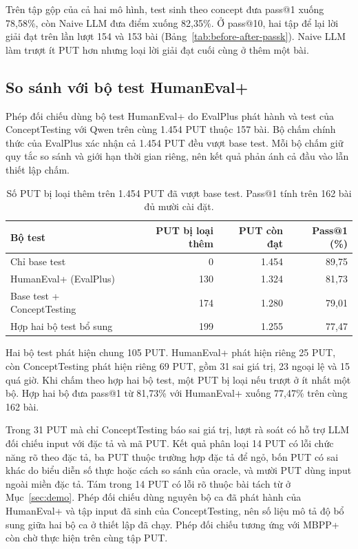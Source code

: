 Trên tập gộp của cả hai mô hình, test sinh theo concept đưa pass@1 xuống 78,58\%, còn Naive LLM đưa điểm xuống 82,35\%. Ở pass@10, hai tập để lại lời giải đạt trên lần lượt 154 và 153 bài (Bảng~\ref{tab:before-after-passk}). Naive LLM làm trượt ít PUT hơn nhưng loại lời giải đạt cuối cùng ở thêm một bài.

\subsection{So sánh với bộ test HumanEval+}
\label{sec:evalplus-comparison}

Phép đối chiếu dùng bộ test HumanEval+ do EvalPlus phát hành và test của ConceptTesting với Qwen trên cùng 1.454 PUT thuộc 157 bài. Bộ chấm chính thức của EvalPlus xác nhận cả 1.454 PUT đều vượt base test. Mỗi bộ chấm giữ quy tắc so sánh và giới hạn thời gian riêng, nên kết quả phản ánh cả đầu vào lẫn thiết lập chấm.

\begin{table}[!htbp]
\centering
\caption[Đối chiếu với HumanEval+ trên cùng tập PUT]{Số PUT bị loại thêm trên 1.454 PUT đã vượt base test. Pass@1 tính trên 162 bài đủ mười cài đặt.}
\label{tab:evalplus-comparison}
\small
\begin{tabular*}{\linewidth}{@{\extracolsep{\fill}}lrrr@{}}
\toprule
Bộ test & PUT bị loại thêm & PUT còn đạt & Pass@1 (\%) \\
\midrule
Chỉ base test & 0 & 1.454 & 89,75 \\
HumanEval+ (EvalPlus) & 130 & 1.324 & 81,73 \\
Base test + ConceptTesting & 174 & 1.280 & 79,01 \\
Hợp hai bộ test bổ sung & 199 & 1.255 & 77,47 \\
\bottomrule
\end{tabular*}
\end{table}

Hai bộ test phát hiện chung 105 PUT. HumanEval+ phát hiện riêng 25 PUT, còn ConceptTesting phát hiện riêng 69 PUT, gồm 31 sai giá trị, 23 ngoại lệ và 15 quá giờ. Khi chấm theo hợp hai bộ test, một PUT bị loại nếu trượt ở ít nhất một bộ. Hợp hai bộ đưa pass@1 từ 81,73\% với HumanEval+ xuống 77,47\% trên cùng 162 bài.

Trong 31 PUT mà chỉ ConceptTesting báo sai giá trị, lượt rà soát có hỗ trợ LLM đối chiếu input với đặc tả và mã PUT. Kết quả phân loại 14 PUT có lỗi chức năng rõ theo đặc tả, ba PUT thuộc trường hợp đặc tả để ngỏ, bốn PUT có sai khác do biểu diễn số thực hoặc cách so sánh của oracle, và mười PUT dùng input ngoài miền đặc tả. Tám trong 14 PUT có lỗi rõ thuộc bài tách từ ở Mục~\ref{sec:demo}. Phép đối chiếu dùng nguyên bộ ca đã phát hành của HumanEval+ và tập input đã sinh của ConceptTesting, nên số liệu mô tả độ bổ sung giữa hai bộ ca ở thiết lập đã chạy. Phép đối chiếu tương ứng với MBPP+ còn chờ thực hiện trên cùng tập PUT.

